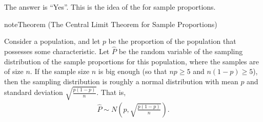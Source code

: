 \documentclass[letterpaper,10pt,english]{jupyterBook}
\begin{document}
\sphinxAtStartPar
The answer is “Yes”. This is the idea of the  for sample proportions.
\label{None:theorem-0}
\begin{sphinxadmonition}{note}{Theorem  (The Central Limit Theorem for Sample Proportions)}



\sphinxAtStartPar
Consider a population, and let \(p\) be the proportion of the population that possesses some characteristic. Let \(\hat{P}\) be the random variable of the sampling distribution of the sample proportions for this population, where the samples are of size \(n\). If the sample size \(n\) is big enough (so that \(np \geq 5\) and \(n(1-p) \geq 5\)), then the sampling distribution is roughly a normal distribution with mean \(p\) and standard deviation \(\sqrt{\frac{p(1-p)}{n}}\). That is,
\begin{equation*}
\begin{split} \hat{P} \sim N\left(p, \sqrt{\frac{p(1-p)}{n}} \right). \end{split}
\end{equation*}\end{sphinxadmonition}
\end{document}
